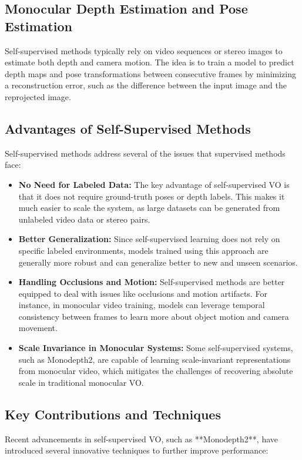 \documentclass[12pt]{article}
\begin{document}
\subsection{Monocular Depth Estimation and Pose Estimation}
Self-supervised methods typically rely on video sequences or stereo images to estimate both depth and camera motion. The idea is to train a model to predict depth maps and pose transformations between consecutive frames by minimizing a reconstruction error, such as the difference between the input image and the reprojected image.

\subsection{Advantages of Self-Supervised Methods}
Self-supervised methods address several of the issues that supervised methods face:

\begin{itemize}
    \item \textbf{No Need for Labeled Data:} The key advantage of self-supervised VO is that it does not require ground-truth poses or depth labels. This makes it much easier to scale the system, as large datasets can be generated from unlabeled video data or stereo pairs.
    \item \textbf{Better Generalization:} Since self-supervised learning does not rely on specific labeled environments, models trained using this approach are generally more robust and can generalize better to new and unseen scenarios.
    \item \textbf{Handling Occlusions and Motion:} Self-supervised methods are better equipped to deal with issues like occlusions and motion artifacts. For instance, in monocular video training, models can leverage temporal consistency between frames to learn more about object motion and camera movement.
    \item \textbf{Scale Invariance in Monocular Systems:} Some self-supervised systems, such as Monodepth2, are capable of learning scale-invariant representations from monocular video, which mitigates the challenges of recovering absolute scale in traditional monocular VO.
\end{itemize}

\subsection{Key Contributions and Techniques}
Recent advancements in self-supervised VO, such as **Monodepth2**, have introduced several innovative techniques to further improve performance:
\end{document}
